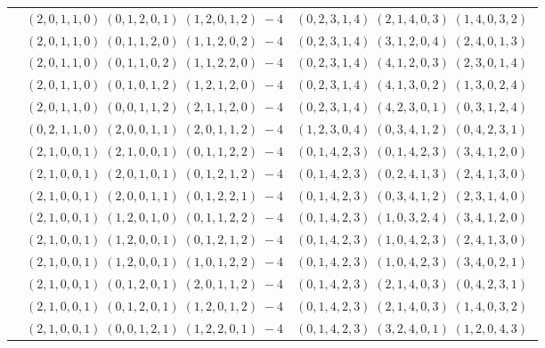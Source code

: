 \documentclass[11pt]{article}
\begin{document}
\begin{longtable}[l]{|c|c|c|}
 \cline{2-3} 
 & $(2 ,0 ,1 ,1 ,0) \;(0 ,1 ,2 ,0 ,1) \;(1 ,2 ,0 ,1 ,2) \;-4$ & $(0 ,2 ,3 ,1 ,4) \;(2 ,1 ,4 ,0 ,3) \;(1 ,4 ,0 ,3 ,2) \;$\\ 
 \cline{2-3} 
 & $(2 ,0 ,1 ,1 ,0) \;(0 ,1 ,1 ,2 ,0) \;(1 ,1 ,2 ,0 ,2) \;-4$ & $(0 ,2 ,3 ,1 ,4) \;(3 ,1 ,2 ,0 ,4) \;(2 ,4 ,0 ,1 ,3) \;$\\ 
 \cline{2-3} 
 & $(2 ,0 ,1 ,1 ,0) \;(0 ,1 ,1 ,0 ,2) \;(1 ,1 ,2 ,2 ,0) \;-4$ & $(0 ,2 ,3 ,1 ,4) \;(4 ,1 ,2 ,0 ,3) \;(2 ,3 ,0 ,1 ,4) \;$\\ 
 \cline{2-3} 
 & $(2 ,0 ,1 ,1 ,0) \;(0 ,1 ,0 ,1 ,2) \;(1 ,2 ,1 ,2 ,0) \;-4$ & $(0 ,2 ,3 ,1 ,4) \;(4 ,1 ,3 ,0 ,2) \;(1 ,3 ,0 ,2 ,4) \;$\\ 
 \cline{2-3} 
 & $(2 ,0 ,1 ,1 ,0) \;(0 ,0 ,1 ,1 ,2) \;(2 ,1 ,1 ,2 ,0) \;-4$ & $(0 ,2 ,3 ,1 ,4) \;(4 ,2 ,3 ,0 ,1) \;(0 ,3 ,1 ,2 ,4) \;$\\ 
 \cline{2-3} 
 & $(0 ,2 ,1 ,1 ,0) \;(2 ,0 ,0 ,1 ,1) \;(2 ,0 ,1 ,1 ,2) \;-4$ & $(1 ,2 ,3 ,0 ,4) \;(0 ,3 ,4 ,1 ,2) \;(0 ,4 ,2 ,3 ,1) \;$\\ 
 \cline{2-3} 
 & $(2 ,1 ,0 ,0 ,1) \;(2 ,1 ,0 ,0 ,1) \;(0 ,1 ,1 ,2 ,2) \;-4$ & $(0 ,1 ,4 ,2 ,3) \;(0 ,1 ,4 ,2 ,3) \;(3 ,4 ,1 ,2 ,0) \;$\\ 
 \cline{2-3} 
 & $(2 ,1 ,0 ,0 ,1) \;(2 ,0 ,1 ,0 ,1) \;(0 ,1 ,2 ,1 ,2) \;-4$ & $(0 ,1 ,4 ,2 ,3) \;(0 ,2 ,4 ,1 ,3) \;(2 ,4 ,1 ,3 ,0) \;$\\ 
 \cline{2-3} 
 & $(2 ,1 ,0 ,0 ,1) \;(2 ,0 ,0 ,1 ,1) \;(0 ,1 ,2 ,2 ,1) \;-4$ & $(0 ,1 ,4 ,2 ,3) \;(0 ,3 ,4 ,1 ,2) \;(2 ,3 ,1 ,4 ,0) \;$\\ 
 \cline{2-3} 
 & $(2 ,1 ,0 ,0 ,1) \;(1 ,2 ,0 ,1 ,0) \;(0 ,1 ,1 ,2 ,2) \;-4$ & $(0 ,1 ,4 ,2 ,3) \;(1 ,0 ,3 ,2 ,4) \;(3 ,4 ,1 ,2 ,0) \;$\\ 
 \cline{2-3} 
 & $(2 ,1 ,0 ,0 ,1) \;(1 ,2 ,0 ,0 ,1) \;(0 ,1 ,2 ,1 ,2) \;-4$ & $(0 ,1 ,4 ,2 ,3) \;(1 ,0 ,4 ,2 ,3) \;(2 ,4 ,1 ,3 ,0) \;$\\ 
 \cline{2-3} 
 & $(2 ,1 ,0 ,0 ,1) \;(1 ,2 ,0 ,0 ,1) \;(1 ,0 ,1 ,2 ,2) \;-4$ & $(0 ,1 ,4 ,2 ,3) \;(1 ,0 ,4 ,2 ,3) \;(3 ,4 ,0 ,2 ,1) \;$\\ 
 \cline{2-3} 
 & $(2 ,1 ,0 ,0 ,1) \;(0 ,1 ,2 ,0 ,1) \;(2 ,0 ,1 ,1 ,2) \;-4$ & $(0 ,1 ,4 ,2 ,3) \;(2 ,1 ,4 ,0 ,3) \;(0 ,4 ,2 ,3 ,1) \;$\\ 
 \cline{2-3} 
 & $(2 ,1 ,0 ,0 ,1) \;(0 ,1 ,2 ,0 ,1) \;(1 ,2 ,0 ,1 ,2) \;-4$ & $(0 ,1 ,4 ,2 ,3) \;(2 ,1 ,4 ,0 ,3) \;(1 ,4 ,0 ,3 ,2) \;$\\ 
 \cline{2-3} 
 & $(2 ,1 ,0 ,0 ,1) \;(0 ,0 ,1 ,2 ,1) \;(1 ,2 ,2 ,0 ,1) \;-4$ & $(0 ,1 ,4 ,2 ,3) \;(3 ,2 ,4 ,0 ,1) \;(1 ,2 ,0 ,4 ,3) \;$\\ 

\end{longtable}
\end{document}
